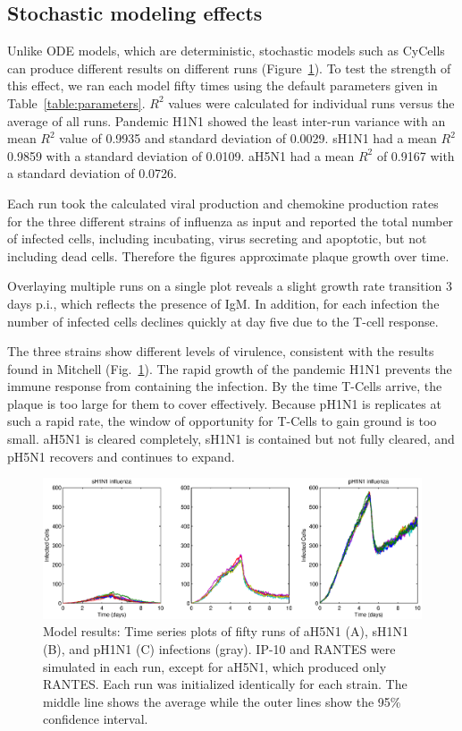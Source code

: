\documentclass[10pt]{article}
\begin{document}
\subsection*{Stochastic modeling effects}

Unlike ODE models, which are deterministic, stochastic models such as CyCells can produce different results on different runs (Figure~\ref{fig:variance}).  To test the strength of this effect, we ran each model fifty times using the default parameters given in Table~\ref{table:parameters}.  $R^2$ values were calculated for individual runs versus the average of all runs.  Pandemic H1N1 showed the least inter-run variance with an mean $R^2$ value of 0.9935 and standard deviation of 0.0029.  sH1N1 had a mean $R^2$ 0.9859 with a standard deviation of 0.0109.  aH5N1 had a mean $R^2$ of 0.9167 with a standard deviation of 0.0726.  

Each run took the calculated viral production and chemokine production rates for the three different strains of influenza as input and reported the total number of infected cells, including incubating, virus secreting and apoptotic, but not including dead cells.  Therefore the figures approximate plaque growth over time.

Overlaying multiple runs on a single plot reveals a slight growth rate transition 3 days p.i., which reflects the presence of IgM.  In addition, for each infection the number of infected cells declines quickly at day five due to the T-cell response. 

The three strains show different levels of virulence, consistent with the results found in Mitchell (Fig.~\ref{fig:variance}).  The rapid growth of the pandemic H1N1 prevents the immune response from containing the infection.  By the time T-Cells arrive, the plaque is too large for them to cover effectively.  Because pH1N1 is replicates at such a rapid rate, the window of opportunity for T-Cells to gain ground is too small.  aH5N1 is cleared completely, sH1N1 is contained but not fully cleared, and pH5N1 recovers and continues to expand.

\begin{figure}[ht!]
\begin{center}
 \includegraphics[width=\textwidth]{variance}
 \end{center}
\caption{Model results: Time series plots of fifty runs of aH5N1 (A), sH1N1 (B), and pH1N1 (C) infections (gray). IP-10 and RANTES were simulated in each run, except for aH5N1, which  produced only RANTES.  Each run was initialized identically for each strain.  The middle line shows the average while the outer lines show the 95\% confidence interval.} 
 \label{fig:variance}
\end{figure}
\end{document}
